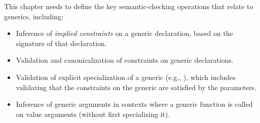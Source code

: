 
\begin{TODO}
This chapter needs to define the key semantic-checking operations that relate to generics, including:

\begin{itemize}
\item Inference of \emph{implied constraints} on a generic declaration, based on the signature of that declaration.

\item Validation and canonicalization of constraints on generic declarations.

\item Validation of explicit specialization of a generic (e.g., ), which includes validating that the constraints on the generic are satisfied by the parameters.

\item Inference of generic arguments in contexts where a generic function is called on value arguments (without first specializing it).
\end{itemize}

\end{TODO}
